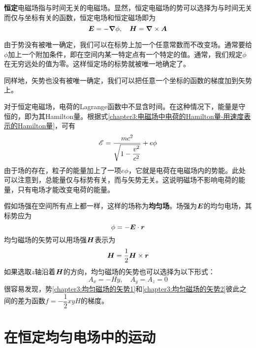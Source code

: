 {\bf 恒定}电磁场指与时间无关的电磁场。显然，恒定电磁场的势可以选择为与时间无关而仅与坐标有关的函数，恒定电场和恒定磁场即为
\begin{equation*}
	\boldsymbol{E} = -\boldsymbol{\nabla} \phi,\quad \boldsymbol{H} = \boldsymbol{\nabla} \times \boldsymbol{A}
\end{equation*}

由于势没有被唯一确定，我们可以在标势上加一个任意常数而不改变场。通常要给$\phi$加上一个附加条件，即在空间内某一特定点有一个特定的值。通常，我们规定$\phi$在无穷远处的值为零。这样恒定场的标势就被唯一地确定了。

同样地，矢势也没有被唯一确定，我们可以把任意一个坐标的函数的梯度加到矢势上。

对于恒定电磁场，电荷的Lagrange函数中不显含时间。在这种情况下，能量是守恒的，即为其Hamilton量。根据式\eqref{chapter3:电磁场中电荷的Hamilton量-用速度表示的Hamilton量}，可有
\begin{equation}
	\mathscr{E} = \frac{mc^2}{\sqrt{1-\dfrac{v^2}{c^2}}}+e\phi
	\label{chapter3:恒定电磁场中电荷的总能量}
\end{equation}
由于场的存在，粒子的能量加上了一项$e\phi$，它就是电荷在电磁场内的势能。此处可以注意到，总能量仅与标势有关，而与矢势无关。这说明磁场不影响电荷的能量，只有电场才能改变电荷的能量。

假如场强在空间所有点上都一样，这样的场称为{\bf 均匀场}。场强为$\boldsymbol{E}$的均匀电场，其标势应为
\begin{equation}
	\phi = -\boldsymbol{E}\cdot \boldsymbol{r}
	\label{chapter3:恒定均匀电场的标势}
\end{equation}
均匀磁场的矢势可以用场强$\boldsymbol{H}$表示为
\begin{equation}
	\boldsymbol{H} = \frac12 \boldsymbol{H}\times \boldsymbol{r}
	\label{chapter3:均匀磁场的矢势1}
\end{equation}
如果选取$z$轴沿着$\boldsymbol{H}$的方向，均匀磁场的矢势也可以选择为以下形式：
\begin{equation}
	A_x = -Hy,\quad A_y = A_z = 0
	\label{chapter3:均匀磁场的矢势2}
\end{equation}
很容易发现，势\eqref{chapter3:均匀磁场的矢势1}和\eqref{chapter3:均匀磁场的矢势2}彼此之间的差为函数$f = -\dfrac12 xyH$的梯度。

\section{在恒定均匀电场中的运动}\label{chapter3:section:在恒定均匀电场中的运动}

